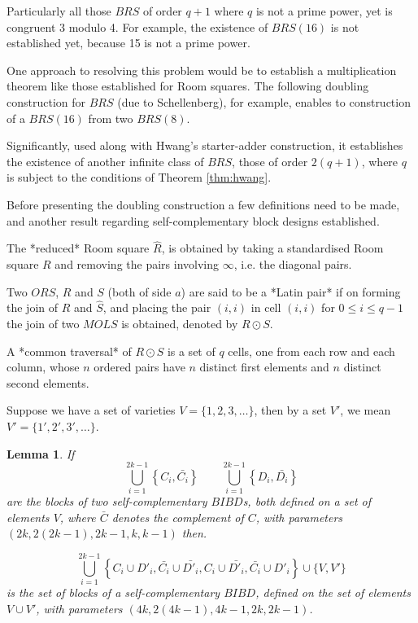 \documentclass[
  11pt,
  a4paper]{book}\usepackage[]{graphicx}\usepackage[]{xcolor}
\newtheorem{lemma}[theorem]{Lemma}
\newcounter{example}
\begin{document}
Particularly all those $BRS$ of order $q + 1$ where $q$ is not a
prime power, yet is congruent 3 modulo 4. For example, the
existence of $BRS(16)$ is not established yet, because 15 is
not a prime power.

One approach to resolving this problem
would be to establish a multiplication theorem like those
established for Room squares. The following doubling
construction for $BRS$ (due to Schellenberg), for example,
enables to construction of a $BRS(16)$ from two $BRS(8)$.

Significantly, used along with Hwang’s starter-adder
construction, it establishes the existence of another
infinite class of $BRS$, those of order $2(q + 1)$, where $q$
is subject to the conditions of Theorem \ref{thm:hwang}.

Before presenting the doubling construction a few
definitions need to be made, and another result regarding
self-complementary block designs established.

The *reduced* Room square $\hat{R}$, is obtained by taking a
standardised Room square $R$ and removing the pairs
involving $\infty$, i.e. the diagonal pairs.

Two $ORS$, $R$ and $S$ (both of side $a$) are said to be a
*Latin pair* if on forming the join of $\hat{R}$ and
$\hat{S}$, and placing the pair $(i, i)$ in cell $(i, i)$ for
$0 \leq i \leq q - 1$ the join of two $MOLS$ is obtained,
denoted by $R \odot S$.

A *common traversal* of $R \odot S$ is a set of $q$ cells,
one from each row and each column, whose $n$ ordered pairs
have $n$ distinct first elements and $n$ distinct second
elements.

Suppose we have a set of varieties $V = \{1, 2, 3, \ldots\}$, then
by a set $V'$, we mean $V'=\{1', 2', 3', \ldots\}$.

\begin{lemma}
If
\begin{equation}
  \bigcup\limits_{i=1}^{2k-1} \left \{C_i,\bar{C_i} \right \} 
  \qquad \bigcup\limits_{i=1}^{2k-1} \left \{D_i,\bar{D_i} \right \}
\end{equation}
are the blocks of two self-complementary $BIBD$s, both
defined on a set of elements $V$, where $\bar{C}$ denotes
the complement of $C$, with parameters
$(2k, 2(2k - 1), 2k - 1, k, k-1)$ then.

\begin{equation}
\bigcup\limits_{i=1}^{2k-1} \left \{C_i \cup D'_i, \bar{C_i} \cup \bar{D'_i}, C_i \cup \bar{D'_i}, \bar{C_i} \cup D'_i  \right \} \cup \{V,V'\}
\end{equation}
is the set of blocks of a self-complementary $BIBD$, defined
on the set of elements $V \cup V'$, with parameters
$(4k, 2(4k - 1), 4k - 1, 2k, 2k - 1)$.
\end{lemma}
\end{document}
